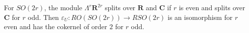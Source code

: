 For $SO(2r)$, the module $\Lambda^r \mathbf{R}^{2r}$ splits over $\mathbf{R}$ and $\mathbf{C}$ if $r$ is even and splits over $\mathbf{C}$ for $r$ odd. Then $\varepsilon_U: RO(SO(2r)) \rightarrow RSO(2r)$ is an isomorphism for $r$ even and has the cokernel of order $2$ for $r$ odd.
